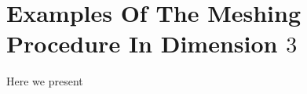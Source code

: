 \section{Examples Of The Meshing Procedure In Dimension $3$} %
\label{sec:examples_of_the_meshing_procedure}

Here we present


